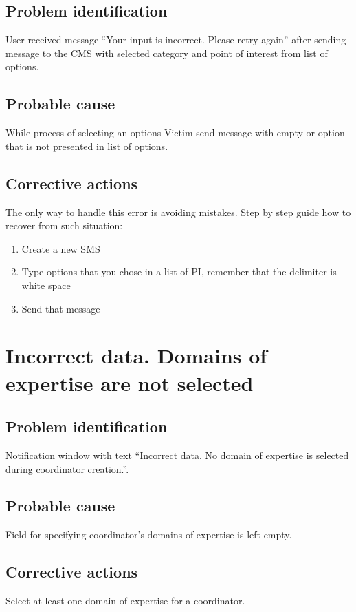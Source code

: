 \subsection{Problem identification}
User received message ``Your input is incorrect. Please
retry again'' after sending message to the CMS with
selected category and point of interest from list of options. 

\subsection{Probable cause}
While process of selecting an options Victim send message with empty or option
that is not presented in list of options.

\subsection{Corrective actions}
The only way to handle this error is avoiding mistakes. Step by step guide how to recover from such situation:
\begin{enumerate}
  \item Create a new SMS
  \item Type options that you chose in a list of PI, remember that the delimiter
  is white space
  \item Send that message
\end{enumerate}

\section{Incorrect data. Domains of expertise are not selected}

\subsection{Problem identification}
Notification window with text ``Incorrect data. No domain of expertise is
selected during coordinator creation.''.

\subsection{Probable cause}
Field for specifying coordinator’s domains of expertise is left empty.

\subsection{Corrective actions}
Select at least one domain of expertise for a coordinator.

